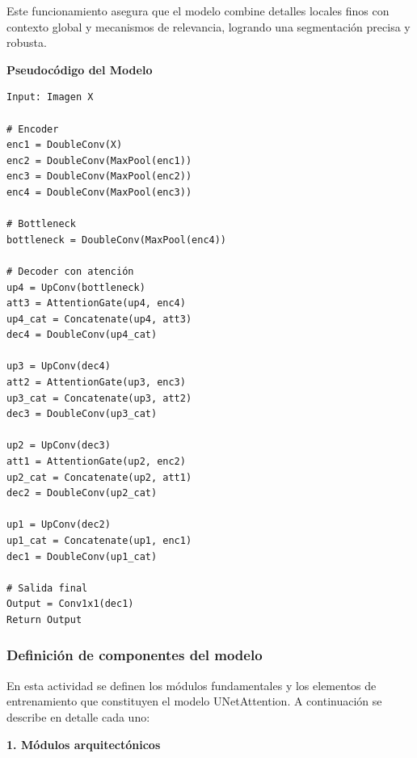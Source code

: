 Este funcionamiento asegura que el modelo combine detalles locales finos con contexto global y mecanismos de relevancia, logrando una segmentación precisa y robusta.

\textbf{Pseudocódigo del Modelo}
\begin{verbatim}
Input: Imagen X

# Encoder
enc1 = DoubleConv(X)
enc2 = DoubleConv(MaxPool(enc1))
enc3 = DoubleConv(MaxPool(enc2))
enc4 = DoubleConv(MaxPool(enc3))

# Bottleneck
bottleneck = DoubleConv(MaxPool(enc4))

# Decoder con atención
up4 = UpConv(bottleneck)
att3 = AttentionGate(up4, enc4)
up4_cat = Concatenate(up4, att3)
dec4 = DoubleConv(up4_cat)

up3 = UpConv(dec4)
att2 = AttentionGate(up3, enc3)
up3_cat = Concatenate(up3, att2)
dec3 = DoubleConv(up3_cat)

up2 = UpConv(dec3)
att1 = AttentionGate(up2, enc2)
up2_cat = Concatenate(up2, att1)
dec2 = DoubleConv(up2_cat)

up1 = UpConv(dec2)
up1_cat = Concatenate(up1, enc1)
dec1 = DoubleConv(up1_cat)

# Salida final
Output = Conv1x1(dec1)
Return Output
\end{verbatim}

\subsubsection{Definición de componentes del modelo}
En esta actividad se definen los módulos fundamentales y los elementos de entrenamiento que constituyen el modelo UNetAttention. A continuación se describe en detalle cada uno:

\textbf{1. Módulos arquitectónicos}

